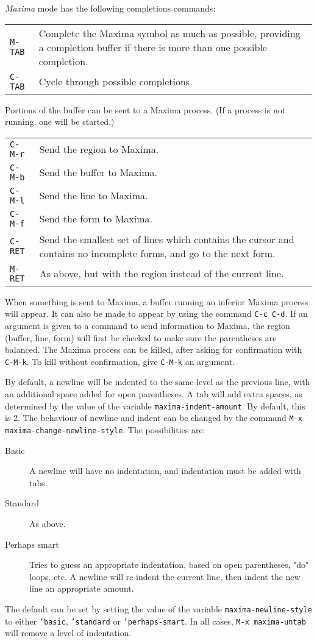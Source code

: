 \documentclass{article}
\newcommand{\mx}{\textsl{\sffamily Maxima}}
\begin{document}
\noindent
\mx{} mode has the following completions commands:

\begin{tabular}{p{\firstcol}p{\secondcol}}
\texttt{M-TAB} & Complete the Maxima symbol as much as possible, providing
     a completion buffer if there is more than one possible
     completion.\\
\texttt{C-TAB} & Cycle through possible completions.
\end{tabular}

Portions of the buffer can be sent to a Maxima process.  (If a process is 
not running, one will be started.)

\begin{tabular}{p{\firstcol}p{\secondcol}}
\texttt{C-M-r} & Send the region to Maxima.\\
\texttt{C-M-b} & Send the buffer to Maxima.\\
\texttt{C-M-l} & Send the line to Maxima.\\
\texttt{C-M-f} & Send the form to Maxima.\\
\texttt{C-RET} & Send the smallest set of lines which contains
the cursor and contains no incomplete forms, and go to the next form.\\
\texttt{M-RET} &  As above, but with the region instead of the current line.
\end{tabular}

\noindent
When something is sent to Maxima, a buffer running an inferior Maxima 
process will appear.  It can also be made to appear by using the command
\texttt{C-c C-d}.
If an argument is given to a command to send information to Maxima,
the region (buffer, line, form) will first be checked to make sure
the parentheses are balanced.
The Maxima process can be killed, after asking for confirmation 
with \texttt{C-M-k}.  To kill without confirmation, give \texttt{C-M-k}
an argument.

By default, a newline will be indented to the same level as the 
previous line, with an additional space added for open parentheses.
A tab will add extra spaces, as determined by the value of the 
variable \texttt{maxima-indent-amount}.  By default, this is 2.
The behaviour of newline and indent can be changed by the command 
\texttt{M-x maxima-change-newline-style}.  The possibilities are:
\begin{description}
\item[Basic] A newline will have no indentation, and indentation
               must be added with tabs.
\item[Standard]      As above.
\item[Perhaps smart] Tries to guess an appropriate indentation, based on
               open parentheses, "do" loops, etc.
               A newline will re-indent the current line, then indent
               the new line an appropriate amount.
\end{description}
The default can be set by setting the value of the variable 
\texttt{maxima-newline-style} to either \texttt{'basic}, 
\texttt{'standard} or \texttt{'perhaps-smart}.
In all cases, \texttt{M-x maxima-untab} will remove a level of indentation.
\end{document}
